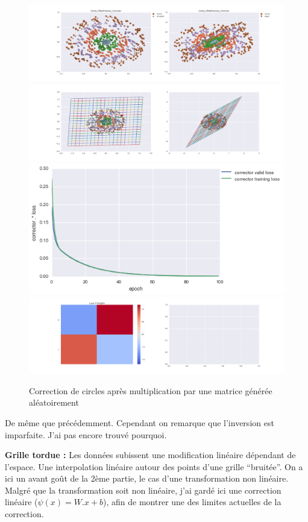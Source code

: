 \begin{figure}[H] %
\centering
\includegraphics[width=\linewidth]{fig/24-05-2016/circles/Circles_RMatPairwise_Corrector-DATA.png}
\includegraphics[width=\linewidth]{fig/24-05-2016/circles/Circles_RMatPairwise_Corrector-GridCheck.png}
\includegraphics[width=0.45\linewidth]{fig/24-05-2016/circles/Circles_RMatPairwise_Corrector-Learning_curve.png}
\includegraphics[width=\linewidth]{fig/24-05-2016/circles/Circles_RMatPairwise_Corrector-W.png}
\caption{Correction de circles après multiplication par une matrice générée aléatoirement}
\label{fig:recap-circles-RMat-pairwise}
\end{figure}

De même que précédemment. Cependant on remarque que l'inversion est imparfaite. J'ai pas encore trouvé pourquoi.

{\Large \textbf{Grille tordue :}} Les données subissent une modification linéaire dépendant de l'espace.
Une interpolation linéaire autour des points d'une grille ``bruitée''.
On a ici un avant goût de la 2ème partie, le cas d'une transformation non linéaire.
Malgré que la transformation soit non linéaire, j'ai gardé ici une correction linéaire ($\psi(x) = W.x+b$),
afin de montrer une des limites actuelles de la correction.

